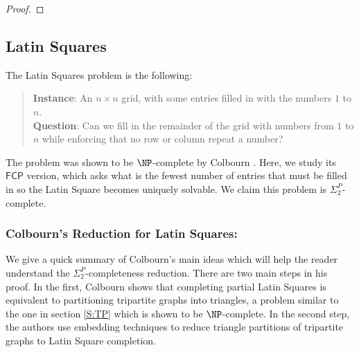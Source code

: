 \documentclass[runningheads,a4paper]{llncs}
\begin{document}
\begin{proof}

\end{proof}

\subsection{Latin Squares}

The Latin Squares problem is the following:
\begin{quote}
\textbf{Instance}: An $n \times n$ grid, with some entries filled in with the numbers $1$ to $n$.\\
\textbf{Question}: Can we fill in the remainder of the grid with numbers from $1$ to $n$ while enforcing that no row or column repeat a number?
\end{quote}
The problem was shown to be $\NP$-complete by Colbourn \cite{colbourn1984complexity}. Here, we study its  $\mathsf{FCP}$ version, which asks what is the fewest number of entries that must be filled in so the Latin Square becomes uniquely solvable. We claim this problem is $\Sigma^P_2$-complete. 

\subsubsection{Colbourn's Reduction for Latin Squares:}
We give a quick summary of Colbourn's main ideas which will help the reader understand the $\Sigma^P_2$-completeness reduction. There are two main steps in his proof. In the first, Colbourn shows that completing partial Latin Squares is equivalent to partitioning tripartite graphs into triangles, a problem similar to the one in section \ref{S:TP} which is shown to be $\NP$-complete. In the second step, the authors use embedding techniques to reduce triangle partitions of tripartite graphs to Latin Square completion. 
\end{document}
